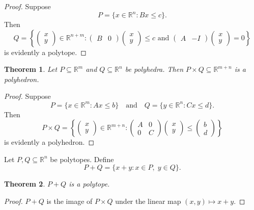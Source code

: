 \documentclass[12pt]{amsart}
\newtheorem{theorem}{Theorem}[section]
\theoremstyle{definition}
\theoremstyle{remark}
\numberwithin{equation}{section}
\newcommand{\RR}{\mathbb{R}}
\begin{document}
\begin{proof}
    Suppose
    \[
        P = \{x\in\RR^n : Bx\leq c\}.
    \]
    Then
    \[
        Q = \left\{
            \begin{pmatrix}x\\y\end{pmatrix} \in\RR^{n + m}:
            \begin{pmatrix}B&0\end{pmatrix}
            \begin{pmatrix}x\\y\end{pmatrix}\leq c\text{ and }
            \begin{pmatrix}A&-I\end{pmatrix}
            \begin{pmatrix}x\\y\end{pmatrix}=0
        \right\}
    \]
    is evidently a polytope.
\end{proof}

\begin{theorem}
    Let $P\subseteq\RR^m$ and $Q\subseteq\RR^n$ be polyhedra.
    Then $P\times Q\subseteq\RR^{m + n}$ is a polyhedron.
\end{theorem}
\begin{proof}
    Suppose
    \[
        P = \{x\in\RR^m : Ax\leq b\}
        \quad\text{and}\quad
        Q = \{y\in\RR^n : Cx\leq d\}.
    \]
    Then
    \[
        P\times Q = \left\{
            \begin{pmatrix}x\\y\end{pmatrix}\in\RR^{m+n} :
            \begin{pmatrix}A&0\\0&C\end{pmatrix}
            \begin{pmatrix}x\\y\end{pmatrix}
            \leq\begin{pmatrix}b\\d\end{pmatrix}    
        \right\}
    \]
    is evidently a polyhedron.
\end{proof}

Let $P,Q\subseteq\RR^n$ be polytopes. Define
\[
    P+Q = \{x + y : x\in P,\; y\in Q\}.
\]
\begin{theorem}
    $P+Q$ is a polytope.
\end{theorem}
\begin{proof}
    $P+Q$ is the image of $P\times Q$ under the linear map
    $(x,y)\mapsto x+y$.
\end{proof}
\end{document}
